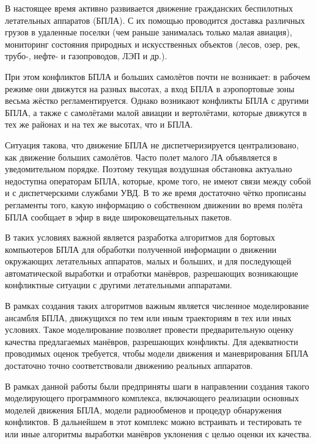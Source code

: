 \documentclass[a4paper,12pt]{article}
\begin{document}
В настоящее время активно развивается движение гражданских беспилотных летательных аппаратов (БПЛА). С их помощью проводится доставка различных грузов в удаленные поселки (чем раньше занималась только малая авиация), мониторинг состояния природных и искусственных объектов (лесов, озер, рек, трубо-, нефте- и газопроводов, ЛЭП и др.).

При этом конфликтов БПЛА и больших самолётов почти не возникает: в рабочем режиме они движутся на разных высотах, а вход БПЛА в аэропортовые зоны весьма жёстко регламентируется. Однако возникают конфликты БПЛА  с другими БПЛА, а также с самолётами малой авиации и вертолётами, которые движутся в тех же районах и на тех же высотах, что и БПЛА. 

Ситуация такова, что движение БПЛА не диспетчеризируется централизовано, как движение больших самолётов. Часто полет малого ЛА объявляется в уведомительном порядке. Поэтому текущая воздушная обстановка актуально недоступна операторам БПЛА, которые, кроме того, не имеют связи между собой и с диспетчерскими службами УВД. В то же время достаточно чётко прописаны регламенты того, какую информацию о собственном движении во время полёта БПЛА сообщает в эфир в виде широковещательных пакетов.

В таких условиях важной является разработка алгоритмов для бортовых компьютеров БПЛА для обработки полученной информации о движении окружающих летательных аппаратов, малых и больших, и для последующей автоматической выработки и отработки манёвров, разрешающих возникающие конфликтные ситуации с другими летательными аппаратами. 

В рамках создания таких алгоритмов важным является численное моделирование ансамбля БПЛА, движущихся по тем или иным траекториям в тех или иных условиях. Такое моделирование позволяет провести предварительную оценку качества предлагаемых манёвров, разрешающих конфликты. Для адекватности проводимых оценок требуется, чтобы модели движения и маневрирования БПЛА достаточно точно соответствовали движению реальных аппаратов. 

В рамках данной работы были предприняты шаги в направлении создания такого моделирующего программного комплекса, включающего реализации основных моделей движения БПЛА, модели радиообменов и процедур обнаружения конфликтов. В дальнейшем в этот комплекс можно встраивать и тестировать те или иные алгоритмы выработки манёвров уклонения с целью оценки их качества.

\newpage
\end{document}
